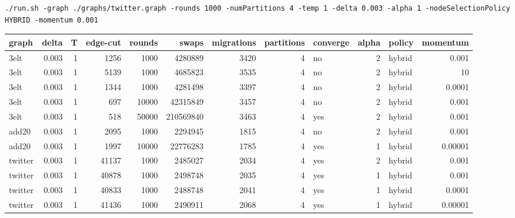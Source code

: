\documentclass[11pt]{article}
\begin{document}
\begin{verbatim}
./run.sh -graph ./graphs/twitter.graph -rounds 1000 -numPartitions 4 -temp 1 -delta 0.003 -alpha 1 -nodeSelectionPolicy HYBRID -momentum 0.001
\end{verbatim}
\begin{center}
\begin{tabular}{lrrrrrrrlrlr}
graph & delta & T & edge-cut & rounds & swaps & migrations & partitions & converge & alpha & policy & momentum\\
\hline
3elt & 0.003 & 1 & 1256 & 1000 & 4280889 & 3420 & 4 & no & 2 & hybrid & 0.001\\
3elt & 0.003 & 1 & 5139 & 1000 & 4685823 & 3535 & 4 & no & 2 & hybrid & 10\\
3elt & 0.003 & 1 & 1344 & 1000 & 4281498 & 3397 & 4 & no & 2 & hybrid & 0.0001\\
3elt & 0.003 & 1 & 697 & 10000 & 42315849 & 3457 & 4 & no & 2 & hybrid & 0.001\\
3elt & 0.003 & 1 & 518 & 50000 & 210569840 & 3463 & 4 & yes & 2 & hybrid & 0.001\\
add20 & 0.003 & 1 & 2095 & 1000 & 2294945 & 1815 & 4 & no & 2 & hybrid & 0.001\\
add20 & 0.003 & 1 & 1997 & 10000 & 22776283 & 1785 & 4 & yes & 1 & hybrid & 0.00001\\
twitter & 0.003 & 1 & 41137 & 1000 & 2485027 & 2034 & 4 & yes & 2 & hybrid & 0.001\\
twitter & 0.003 & 1 & 40878 & 1000 & 2498748 & 2035 & 4 & yes & 1 & hybrid & 0.001\\
twitter & 0.003 & 1 & 40833 & 1000 & 2488748 & 2041 & 4 & yes & 1 & hybrid & 0.0001\\
twitter & 0.003 & 1 & 41436 & 1000 & 2490911 & 2068 & 4 & yes & 1 & hybrid & 0.00001\\
\end{tabular}
\end{center}
\end{document}
